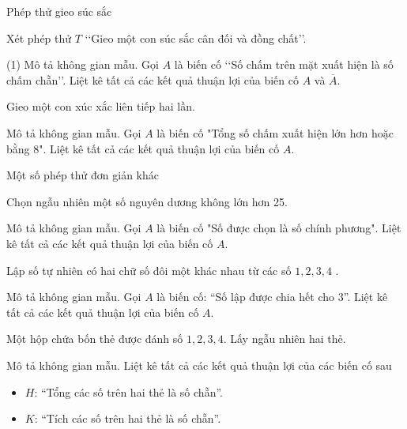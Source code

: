 \begin{dang}{Phép thử gieo súc sắc}
\end{dang}

\begin{vd}%
	Xét phép thử $T$ \lq\lq Gieo một con súc sắc cân đối và đồng chất\rq\rq. 
	\begin{tasks}(1)
		\task Mô tả không gian mẫu.
		\task Gọi $A$ là biến cố \lq\lq Số chấm trên mặt xuất hiện là số chấm chẵn\rq\rq. Liệt kê tất cả các kết quả thuận lợi của biến cố $A$ và $\overline{A}$.
	\end{tasks}
	\loigiai{
		
	}
\end{vd} 

\begin{vd}
	Gieo một con xúc xắc liên tiếp hai lần.
	\begin{tasks}
		\task Mô tả không gian mẫu.
		\task Gọi $A$ là biến cố "Tổng số chấm xuất hiện lớn hơn hoặc bằng 8". Liệt kê tất cả các kết quả thuận lợi của biến cố $A$.
	\end{tasks}
\end{vd} 

\begin{dang}{Một số phép thử đơn giản khác}
\end{dang}

\begin{vd}
	Chọn ngẫu nhiên một số nguyên dương không lớn hơn 25.
	\begin{tasks}
		\task Mô tả không gian mẫu.
		\task Gọi $A$ là biến cố "Số được chọn là số chính phương". Liệt kê tất cả các kết quả thuận lợi của biến cố $A$.
	\end{tasks}
\end{vd} 

\begin{vd}
	Lập số tự nhiên có hai chữ số đôi một khác nhau từ các số $1,2,3,4$ .
	\begin{tasks}
	\task Mô tả không gian mẫu.
	\task Gọi  $A$ là biến cố: “Số lập được chia hết cho $3$”. Liệt kê tất cả các kết quả thuận lợi của biến cố $A$.
	\end{tasks}
\end{vd} 

\begin{vd}
	Một hộp chứa bốn  thẻ được đánh số $1, 2, 3, 4$. Lấy ngẫu nhiên hai thẻ.
	\begin{tasks}
		\task	Mô tả không gian mẫu. 
		\task	Liệt kê tất cả các kết quả thuận lợi của các biến cố sau
		\begin{itemize}
			\item $H$: “Tổng các số trên hai thẻ là số chẵn”.
			\item $K$: “Tích các số trên hai thẻ là số chẵn”.
		\end{itemize}
	\end{tasks}
\end{vd} 

